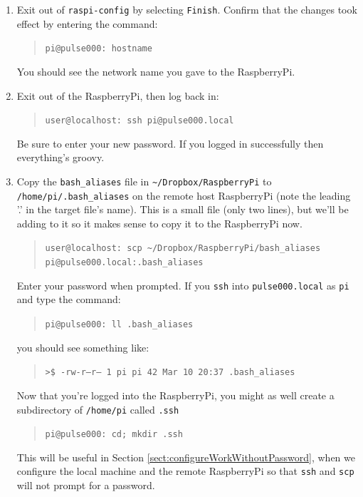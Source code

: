 \documentclass[11pt,oneside]{article}
\makeatletter
\newcommand{\localCommand}[1]{\begin{quote} \texttt{user@localhost: #1} \end{quote}}
\newcommand{\remoteCommandAfterRename}[1]{\begin{quote} \texttt{pi@pulse000: #1} \end{quote}}
\newcommand{\xtermOutput}[1]{\begin{quote} \texttt{>\$ #1} \end{quote}}
\makeatother
\begin{document}
\begin{enumerate}
	\item Exit out of \texttt{raspi-config} by selecting \texttt{Finish}.  Confirm that the changes took effect by entering the command: \remoteCommandAfterRename{hostname}
	You should see the network name you gave to the RaspberryPi.
	\item Exit out of the RaspberryPi, then log back in: \localCommand{ssh pi@pulse000.local}
	Be sure to enter your new password.  If you logged in successfully then everything's groovy.
	\item \label{itm:copyBashAliases} Copy the \texttt{bash\_aliases} file in \texttt{{\textasciitilde}/Dropbox/RaspberryPi} to \texttt{/home/pi/.bash\_aliases} on 
	the remote host RaspberryPi (note the leading '.' in the target file's name).
	This is a small file (only two lines), but we'll be adding to it so it makes sense to copy it to the RaspberryPi now.
	\localCommand{scp {\textasciitilde}/Dropbox/RaspberryPi/bash\_aliases pi@pulse000.local:.bash\_aliases}
	Enter your password when prompted.  If you \texttt{ssh} into \texttt{pulse000.local} as \texttt{pi} and type the command: \remoteCommandAfterRename{ll .bash\_aliases} you should see something
	like: \xtermOutput{-rw-r--r-- 1 pi pi 42 Mar 10 20:37 .bash\_aliases}
	Now that you're logged into the RaspberryPi, you might as well create a subdirectory of \texttt{/home/pi} called \texttt{.ssh} \remoteCommandAfterRename{cd; mkdir .ssh}
	This will be useful in Section \ref{sect:configureWorkWithoutPassword},
	when we configure the local machine and the remote RaspberryPi so that \texttt{ssh} and \texttt{scp} will not prompt for a password.
\end{enumerate}
\end{document}
